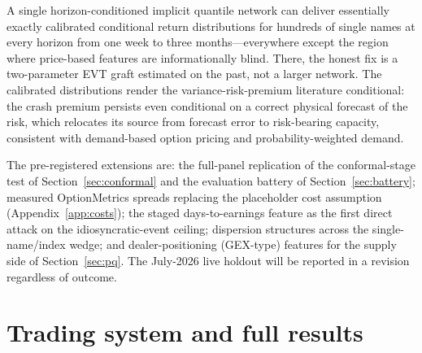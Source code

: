 \documentclass[11pt]{article}
\begin{document}
A single horizon-conditioned implicit quantile network can deliver essentially exactly calibrated conditional return distributions for hundreds of single names at every horizon from one week to three months---everywhere except the region where price-based features are informationally blind. There, the honest fix is a two-parameter EVT graft estimated on the past, not a larger network. The calibrated distributions render the variance-risk-premium literature conditional: the crash premium persists even conditional on a correct physical forecast of the risk, which relocates its source from forecast error to risk-bearing capacity, consistent with demand-based option pricing and probability-weighted demand.

The pre-registered extensions are: the full-panel replication of the conformal-stage test of Section~\ref{sec:conformal} and the evaluation battery of Section~\ref{sec:battery}; measured OptionMetrics spreads replacing the placeholder cost assumption (Appendix~\ref{app:costs}); the staged days-to-earnings feature as the first direct attack on the idiosyncratic-event ceiling; dispersion structures across the single-name/index wedge; and dealer-positioning (GEX-type) features for the supply side of Section~\ref{sec:pq}. The July-2026 live holdout will be reported in a revision regardless of outcome.




\clearpage
\appendix

\section{Trading system and full results}\label{app:trading}
\end{document}
